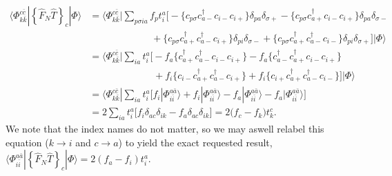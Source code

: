 \documentclass[a4paper]{article}
\newcommand{\nn}{\nonumber}
\newcommand{\ps}{{p\sigma}}
\begin{document}
\begin{align}
\langle \Phi_{k\bar k}^{c\bar c}|\left\{\hat F_N \hat T  \right\}_c |\Phi\rangle &= \langle \Phi_{k\bar k}^{c\bar c}| \sum_{\ps ia} f_p t_i^a \bigg[ -\Big\{  c_\ps c_{a-}^\dagger c_{i-} c_{i+} \Big\}\delta_{pa}\delta_{\sigma +}  -\Big\{  c_\ps  c_{a+}^\dagger  c_{i-} c_{i+} \Big\} \delta_{pa}\delta_{\sigma -} \nn\\
%
& \ \ \ \ \ \ \ \ \ \ \ \ \ \ \ \ \ \ \ \ \ \ \ \ \ \ \ \ \ +\Big\{ c_\ps  c_{a+}^\dagger c_{a-}^\dagger c_{i+} \Big\}\delta_{pi}\delta_{\sigma -} +\Big\{  c_\ps  c_{a+}^\dagger c_{a-}^\dagger c_{i-}  \Big\} \delta_{pi}\delta_{\sigma +}\bigg] | \Phi\rangle \nn\\
%
&= \langle \Phi_{k\bar k}^{c\bar c}| \sum_{ia} t_i^a \bigg[ -f_a \Big\{  c_{a+}^\dagger c_{a-}^\dagger c_{i-} c_{i+} \Big\}  -f_a\Big\{  c_{a-}^\dagger c_{a+}^\dagger  c_{i-} c_{i+} \Big\}  \nn\\
%
&  \ \ \ \ \ \ \ \ \ \ \ \ \ \ \ \ \ \ \ \ \ \ \ \ \ \ \ \ \ \ + f_i \Big\{ c_{i-}  c_{a+}^\dagger c_{a-}^\dagger c_{i+} \Big\} + f_i\Big\{  c_{i+} c_{a+}^\dagger c_{a-}^\dagger c_{i-}  \Big\} \bigg] | \Phi\rangle \nn\\
%
&= \langle \Phi_{k\bar k}^{c\bar c}| \sum_{ia} t_i^a \bigg[ f_i| \Phi_{i\bar i}^{a\bar a}\rangle + f_i| \Phi_{i\bar i}^{a\bar a}\rangle - f_a| \Phi_{i\bar i}^{a\bar a}\rangle - f_a| \Phi_{i\bar i}^{a\bar a}\rangle \bigg] \nn\\
%
&= 2\sum_{ia} t_i^a \big[f_i \delta_{ac}\delta_{ik} - f_a \delta_{ac}\delta_{ik}\big] = 2\big(f_c - f_k\big)t_k^c.
\end{align}
We note that the index names do not matter, so we may aswell relabel this equation ($k\rightarrow i$ and $c\rightarrow a$) to yield the exact requested result, $\langle \Phi_{i\bar i}^{a\bar a} |\left\{\hat F_N \hat T  \right\}_c |\Phi\rangle = 2(f_a - f_i)t_i^a$.
\end{document}
